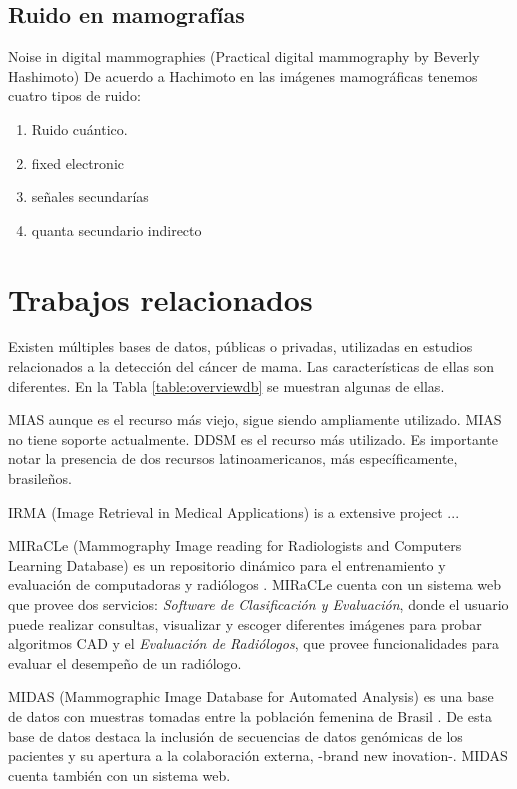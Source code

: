 \subsection{Ruido en mamografías}

\cite{hashimoto2008practical}
Noise in digital mammographies (Practical digital mammography by Beverly
Hashimoto) De acuerdo a Hachimoto en las imágenes mamográficas tenemos cuatro
tipos de ruido:

\begin{enumerate}
    \item Ruido cuántico.
    \item fixed electronic
    \item señales secundarías
    \item quanta secundario indirecto
\end{enumerate}

\section{Trabajos relacionados}

Existen múltiples bases de datos, públicas o privadas, utilizadas en estudios
relacionados a la detección del cáncer de mama. Las características de ellas
son diferentes. En la Tabla \ref{table:overviewdb} se muestran algunas de ellas.

MIAS \cite{sucklingmini} aunque es el recurso más viejo, sigue siendo
ampliamente utilizado. MIAS no tiene soporte actualmente. DDSM
\cite{heath2000digital} es el recurso más utilizado. Es importante notar la
presencia de dos recursos latinoamericanos, más específicamente, brasileños.

IRMA (Image Retrieval in Medical Applications) is a extensive project
\cite{doi:10.1117/12.770325} ...

MIRaCLe (Mammography Image reading for Radiologists and Computers Learning
Database) es un repositorio dinámico para el entrenamiento y evaluación de
computadoras y radiólogos \cite{antoniou2009web}. MIRaCLe cuenta con un sistema
web que provee dos servicios: \textit{Software de Clasificación y Evaluación},
donde el usuario puede realizar consultas, visualizar y escoger diferentes
imágenes para probar algoritmos CAD y el \textit{Evaluación de Radiólogos}, que
provee funcionalidades para evaluar el desempeño de un radiólogo.

MIDAS (Mammographic Image Database for Automated Analysis) es una base de datos
con muestras tomadas entre la población femenina de Brasil
\cite{fernandes2012midas}. De esta base de datos destaca la inclusión de
secuencias de datos genómicas de los pacientes y su apertura a la colaboración
externa, -brand new inovation-. MIDAS cuenta también con un sistema web.


